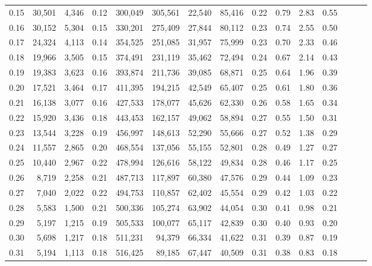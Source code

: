 \begin{tabular}{rrrrrrrrrrrrrrr}
0.15 &  30,501 &  4,346 &  0.12 &  300,049 &  305,561 &   22,540 &   85,416 &  0.22 &  0.79 &  2.83 &      0.55 \\
0.16 &  30,152 &  5,304 &  0.15 &  330,201 &  275,409 &   27,844 &   80,112 &  0.23 &  0.74 &  2.55 &      0.50 \\
0.17 &  24,324 &  4,113 &  0.14 &  354,525 &  251,085 &   31,957 &   75,999 &  0.23 &  0.70 &  2.33 &      0.46 \\
0.18 &  19,966 &  3,505 &  0.15 &  374,491 &  231,119 &   35,462 &   72,494 &  0.24 &  0.67 &  2.14 &      0.43 \\
0.19 &  19,383 &  3,623 &  0.16 &  393,874 &  211,736 &   39,085 &   68,871 &  0.25 &  0.64 &  1.96 &      0.39 \\
0.20 &  17,521 &  3,464 &  0.17 &  411,395 &  194,215 &   42,549 &   65,407 &  0.25 &  0.61 &  1.80 &      0.36 \\
0.21 &  16,138 &  3,077 &  0.16 &  427,533 &  178,077 &   45,626 &   62,330 &  0.26 &  0.58 &  1.65 &      0.34 \\
0.22 &  15,920 &  3,436 &  0.18 &  443,453 &  162,157 &   49,062 &   58,894 &  0.27 &  0.55 &  1.50 &      0.31 \\
0.23 &  13,544 &  3,228 &  0.19 &  456,997 &  148,613 &   52,290 &   55,666 &  0.27 &  0.52 &  1.38 &      0.29 \\
0.24 &  11,557 &  2,865 &  0.20 &  468,554 &  137,056 &   55,155 &   52,801 &  0.28 &  0.49 &  1.27 &      0.27 \\
0.25 &  10,440 &  2,967 &  0.22 &  478,994 &  126,616 &   58,122 &   49,834 &  0.28 &  0.46 &  1.17 &      0.25 \\
0.26 &   8,719 &  2,258 &  0.21 &  487,713 &  117,897 &   60,380 &   47,576 &  0.29 &  0.44 &  1.09 &      0.23 \\
0.27 &   7,040 &  2,022 &  0.22 &  494,753 &  110,857 &   62,402 &   45,554 &  0.29 &  0.42 &  1.03 &      0.22 \\
0.28 &   5,583 &  1,500 &  0.21 &  500,336 &  105,274 &   63,902 &   44,054 &  0.30 &  0.41 &  0.98 &      0.21 \\
0.29 &   5,197 &  1,215 &  0.19 &  505,533 &  100,077 &   65,117 &   42,839 &  0.30 &  0.40 &  0.93 &      0.20 \\
0.30 &   5,698 &  1,217 &  0.18 &  511,231 &   94,379 &   66,334 &   41,622 &  0.31 &  0.39 &  0.87 &      0.19 \\
0.31 &   5,194 &  1,113 &  0.18 &  516,425 &   89,185 &   67,447 &   40,509 &  0.31 &  0.38 &  0.83 &      0.18 \\

\end{tabular}
